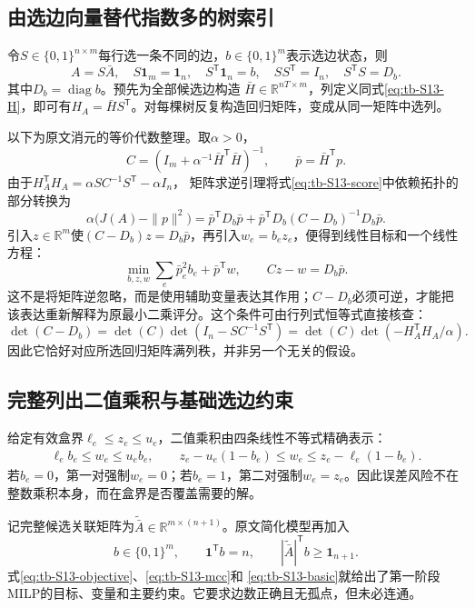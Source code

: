 \subsection{由选边向量替代指数多的树索引}

令$S\in\{0,1\}^{n\times m}$每行选一条不同的边，$b\in\{0,1\}^m$表示选边状态，则
\[
 A=S\bar A,\quad S\mathbf1_m=\mathbf1_n,\quad
 S^{\mathsf T}\mathbf1_n=b,\quad
 SS^{\mathsf T}=I_n,\quad S^{\mathsf T}S=D_b.
\]
其中$D_b=\operatorname{diag}b$。预先为全部候选边构造
$\bar H\in\mathbb R^{nT\times m}$，列定义同式\eqref{eq:tb-S13-H}，即可有$H_A=\bar H S^{\mathsf T}$。对每棵树反复构造回归矩阵，变成从同一矩阵中选列。

以下为原文消元的等价代数整理。取$\alpha>0$，
\begin{equation}
 C=(I_m+\alpha^{-1}\bar H^{\mathsf T}\bar H)^{-1},
 \qquad \bar p=\bar H^{\mathsf T}p.
 \label{eq:tb-S13-C}
\end{equation}
由于$H_A^{\mathsf T}H_A=\alpha SC^{-1}S^{\mathsf T}-\alpha I_n$，
矩阵求逆引理将式\eqref{eq:tb-S13-score}中依赖拓扑的部分转换为
\[
 \alpha\bigl(J(A)-\|p\|^2\bigr)
 =\bar p^{\mathsf T}D_b\bar p+
   \bar p^{\mathsf T}D_b(C-D_b)^{-1}D_b\bar p.
\]
引入$z\in\mathbb R^m$使$(C-D_b)z=D_b\bar p$，再引入$w_e=b_ez_e$，便得到线性目标和一个线性方程：
\begin{equation}
 \min_{b,z,w}\sum_e\bar p_e^2b_e+\bar p^{\mathsf T}w,
 \qquad Cz-w=D_b\bar p.
 \label{eq:tb-S13-objective}
\end{equation}
这不是将矩阵逆忽略，而是使用辅助变量表达其作用；$C-D_b$必须可逆，才能把该表达重新解释为原最小二乘评分。这个条件可由行列式恒等式直接核查：
\[
 \det(C-D_b)=\det(C)\det(I_n-SC^{-1}S^{\mathsf T})
 =\det(C)\det(-H_A^{\mathsf T}H_A/\alpha).
\]
因此它恰好对应所选回归矩阵满列秩，并非另一个无关的假设。

\subsection{完整列出二值乘积与基础选边约束}

给定有效盒界$\ell_e\leq z_e\leq u_e$，二值乘积由四条线性不等式精确表示：
\begin{align}
 \ell_eb_e\leq w_e\leq u_eb_e,\qquad
 z_e-u_e(1-b_e)\leq w_e\leq z_e-\ell_e(1-b_e).
 \label{eq:tb-S13-mcc}
\end{align}
若$b_e=0$，第一对强制$w_e=0$；若$b_e=1$，第二对强制$w_e=z_e$。因此误差风险不在整数乘积本身，而在盒界是否覆盖需要的解。

记完整候选关联矩阵为$\widetilde{\bar A}\in\mathbb R^{m\times(n+1)}$。原文简化模型再加入
\begin{equation}
 b\in\{0,1\}^m,\qquad \mathbf1^{\mathsf T}b=n,\qquad
 |\widetilde{\bar A}|^{\mathsf T}b\geq\mathbf1_{n+1}.
 \label{eq:tb-S13-basic}
\end{equation}
式\eqref{eq:tb-S13-objective}、\eqref{eq:tb-S13-mcc}和
\eqref{eq:tb-S13-basic}就给出了第一阶段MILP的目标、变量和主要约束。它要求边数正确且无孤点，但未必连通。

